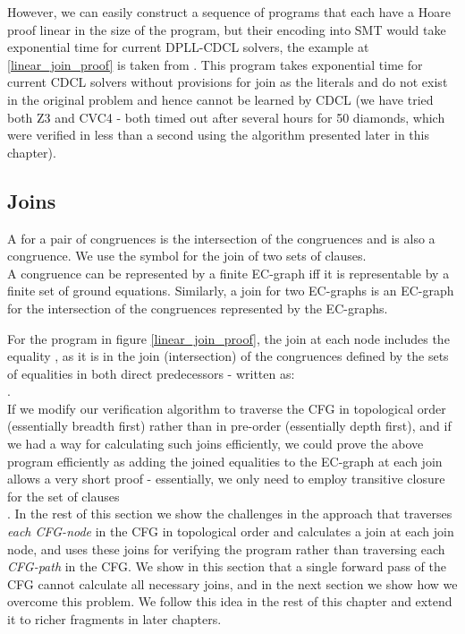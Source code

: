 However, we can easily construct a sequence of programs that each have a Hoare proof linear in the size of the program, but their encoding into SMT would take exponential time for current DPLL-CDCL solvers, the example at \ref{linear_join_proof} is taken from \cite{DPLLJoin}.
This program takes exponential time for current CDCL solvers without provisions for join as the literals  and  do not exist in the original problem and hence cannot be learned by CDCL (we have tried both Z3 and CVC4 - both timed out after several hours for 50 diamonds, which were verified in less than a second using the algorithm presented later in this chapter). 

\subsection{Joins}
A  for a pair of congruences is the intersection of the congruences and is also a congruence. We use the symbol \newdef{\m{\sqcup}} for the join of two sets of clauses.\\
A congruence can be represented by a finite EC-graph iff it is representable by a finite set of ground equations.
Similarly, a join for two EC-graphs is an EC-graph for the intersection of the congruences represented by the EC-graphs.

For the program in figure \ref{linear_join_proof}, the join at each node  includes the equality ,
as it is in the join (intersection) of the congruences defined by the sets of equalities in both direct predecessors - written as:\\
.\\
If we modify our verification algorithm to traverse the CFG in topological order (essentially breadth first) rather than in pre-order (essentially depth first), and if we had a way for calculating such joins efficiently, we could prove the above program efficiently as adding the joined equalities to the EC-graph at each join allows a very short proof - essentially, we only need to employ transitive closure for the set of clauses \\
. 
In the rest of this section we show the challenges in the approach that traverses \emph{each CFG-node} in the CFG in topological order and calculates a join at each join node, and uses these joins for verifying the program rather than traversing each \emph{CFG-path} in the CFG. We show in this section that a single forward pass of the CFG cannot calculate all necessary joins, 
and in the next section we show how we overcome this problem. We follow this idea in the rest of this chapter and extend it to richer fragments in later chapters.


